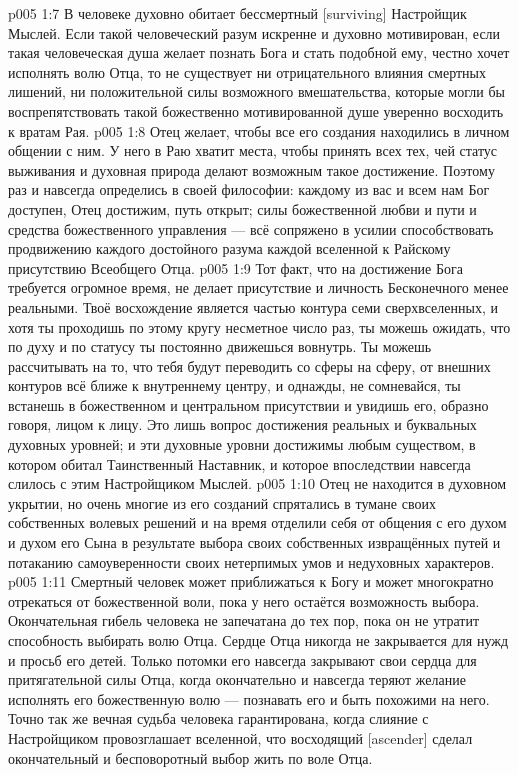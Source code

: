 \vs p005 1:7 В человеке духовно обитает бессмертный [surviving] Настройщик Мыслей. Если такой человеческий разум искренне и духовно мотивирован, если такая человеческая душа желает познать Бога и стать подобной ему, честно хочет исполнять волю Отца, то не существует ни отрицательного влияния смертных лишений, ни положительной силы возможного вмешательства, которые могли бы воспрепятствовать такой божественно мотивированной душе уверенно восходить к вратам Рая.
\vs p005 1:8 Отец желает, чтобы все его создания находились в личном общении с ним. У него в Раю хватит места, чтобы принять всех тех, чей статус выживания и духовная природа делают возможным такое достижение. Поэтому раз и навсегда определись в своей философии: каждому из вас и всем нам Бог доступен, Отец достижим, путь открыт; силы божественной любви и пути и средства божественного управления --- всё сопряжено в усилии способствовать продвижению каждого достойного разума каждой вселенной к Райскому присутствию Всеобщего Отца.
\vs p005 1:9 Тот факт, что на достижение Бога требуется огромное время, не делает присутствие и личность Бесконечного менее реальными. Твоё восхождение является частью контура семи сверхвселенных, и хотя ты проходишь по этому кругу несметное число раз, ты можешь ожидать, что по духу и по статусу ты постоянно движешься вовнутрь. Ты можешь рассчитывать на то, что тебя будут переводить со сферы на сферу, от внешних контуров всё ближе к внутреннему центру, и однажды, не сомневайся, ты встанешь в божественном и центральном присутствии и увидишь его, образно говоря, лицом к лицу. Это лишь вопрос достижения реальных и буквальных духовных уровней; и эти духовные уровни достижимы любым существом, в котором обитал Таинственный Наставник, и которое впоследствии навсегда слилось с этим Настройщиком Мыслей.
\vs p005 1:10 \pc Отец не находится в духовном укрытии, но очень многие из его созданий спрятались в тумане своих собственных волевых решений и на время отделили себя от общения с его духом и духом его Сына в результате выбора своих собственных извращённых путей и потаканию самоуверенности своих нетерпимых умов и недуховных характеров.
\vs p005 1:11 Смертный человек может приближаться к Богу и может многократно отрекаться от божественной воли, пока у него остаётся возможность выбора. Окончательная гибель человека не запечатана до тех пор, пока он не утратит способность выбирать волю Отца. Сердце Отца никогда не закрывается для нужд и просьб его детей. Только потомки его навсегда закрывают свои сердца для притягательной силы Отца, когда окончательно и навсегда теряют желание исполнять его божественную волю --- познавать его и быть похожими на него. Точно так же вечная судьба человека гарантирована, когда слияние с Настройщиком провозглашает вселенной, что восходящий [ascender] сделал окончательный и бесповоротный выбор жить по воле Отца.
